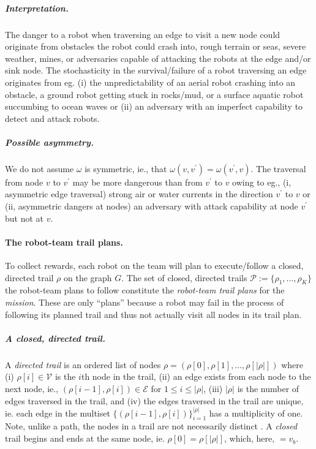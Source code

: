 \documentclass[11pt, oneside]{article}
\begin{document}
\vspace{-\baselineskip}
\subparagraph{Interpretation.} The danger to a robot when traversing an edge to visit a new node could originate from obstacles the robot could crash into, rough terrain or seas, severe weather, mines, or adversaries capable of attacking the robots at the edge and/or sink node.
The stochasticity in the survival/failure of a robot traversing an edge originates from eg. (i) the unpredictability of an aerial robot crashing into an obstacle, a ground robot getting stuck in rocks/mud, or a surface aquatic robot succumbing to ocean waves or (ii) an adversary with an imperfect capability to detect and attack robots.

\vspace{-\baselineskip}
\subparagraph{Possible asymmetry.} We do not assume $\omega$ is symmetric, ie., that $\omega(v, v^\prime) = \omega(v^\prime, v)$. The traversal from node $v$ to $v^\prime$ may be more dangerous than from $v^\prime$ to $v$ owing to eg., (i, asymmetric edge traversal) strong air or water currents in the direction $v^\prime$ to $v$ or (ii, asymmetric dangers at nodes) an adversary with attack capability at node $v^\prime$ but not at $v$. %

\paragraph{The robot-team trail plans.}
To collect rewards, each robot on the team will plan to execute/follow a closed, directed trail $\rho$ on the graph $G$.  
The set of closed, directed trails $\mathcal{P}:=\{\rho_1, ..., \rho_K\}$ the robot-team plans to follow constitute the \emph{robot-team trail plans} for the \emph{mission}. These are only ``plans'' because a robot may fail in the process of following its planned trail and thus not actually visit all nodes in its trail plan.

\vspace{-\baselineskip}
\subparagraph{A closed, directed trail.} 
A \emph{directed trail} is an ordered list of nodes $\rho = (\rho[0], \rho[1], ..., \rho[\lvert \rho \rvert])$ where
(i) $\rho[i] \in \mathcal{V}$ is the $i$th node in the trail,  
(ii) an edge exists from each node to the next node, ie., $(\rho[i-1], \rho[i])\in\mathcal{E}$ for $1 \leq i  \leq \lvert \rho \rvert$,
(iii) $\lvert \rho \rvert$ is the number of edges traversed in the trail,
and
(iv) the edges traversed in the trail are unique, ie. each edge in the multiset $\{(\rho[i-1], \rho[i])\}_{i=1}^{\lvert \rho \rvert}$ has a multiplicity of one.
Note, unlike a path, the nodes in a trail are not necessarily distinct \cite{wilson1979introduction}.
A \emph{closed} trail begins and ends at the same node, ie. $\rho [0]=\rho[\lvert \rho \rvert]$, which, here, $=v_b$.
\end{document}
